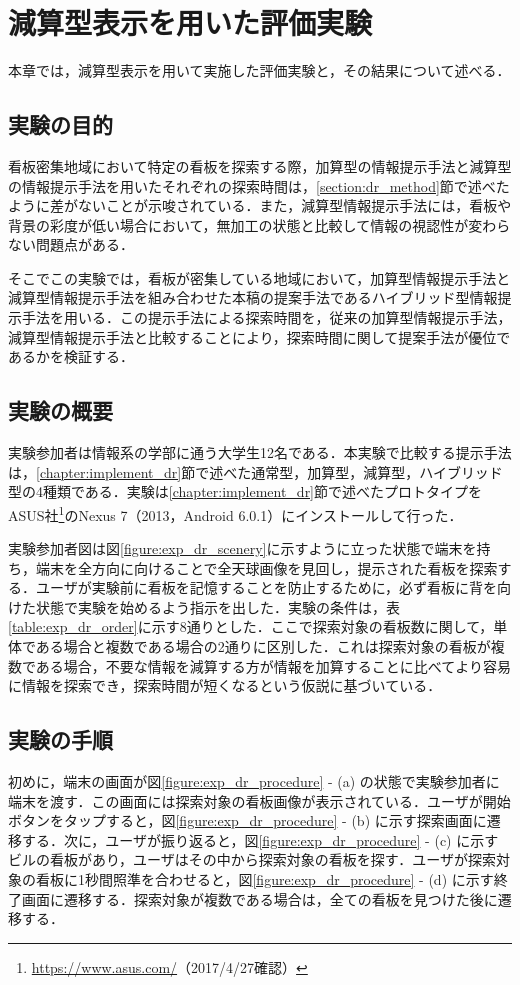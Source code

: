\chapter{減算型表示を用いた評価実験}
\label{chapter:experiment_dr}
本章では，減算型表示を用いて実施した評価実験と，その結果について述べる．
\section{実験の目的}
  看板密集地域において特定の看板を探索する際，加算型の情報提示手法と減算型の情報提示手法を用いたそれぞれの探索時間は，\ref{section:dr_method}節で述べたように差がないことが示唆されている．また，減算型情報提示手法には，看板や背景の彩度が低い場合において，無加工の状態と比較して情報の視認性が変わらない問題点がある．

  そこでこの実験では，看板が密集している地域において，加算型情報提示手法と減算型情報提示手法を組み合わせた本稿の提案手法であるハイブリッド型情報提示手法を用いる．この提示手法による探索時間を，従来の加算型情報提示手法，減算型情報提示手法と比較することにより，探索時間に関して提案手法が優位であるかを検証する．

\section{実験の概要}
  実験参加者は情報系の学部に通う大学生12名である．本実験で比較する提示手法は，\ref{chapter:implement_dr}節で述べた通常型，加算型，減算型，ハイブリッド型の4種類である．実験は\ref{chapter:implement_dr}節で述べたプロトタイプをASUS社\footnote{\url{https://www.asus.com/}（2017/4/27確認）}のNexus 7（2013，Android 6.0.1）にインストールして行った．

  実験参加者図は図\ref{figure:exp_dr_scenery}に示すように立った状態で端末を持ち，端末を全方向に向けることで全天球画像を見回し，提示された看板を探索する．ユーザが実験前に看板を記憶することを防止するために，必ず看板に背を向けた状態で実験を始めるよう指示を出した．実験の条件は，表\ref{table:exp_dr_order}に示す8通りとした．ここで探索対象の看板数に関して，単体である場合と複数である場合の2通りに区別した．これは探索対象の看板が複数である場合，不要な情報を減算する方が情報を加算することに比べてより容易に情報を探索でき，探索時間が短くなるという仮説に基づいている．

\section{実験の手順}
  初めに，端末の画面が図\ref{figure:exp_dr_procedure} - (a) の状態で実験参加者に端末を渡す．この画面には探索対象の看板画像が表示されている．ユーザが開始ボタンをタップすると，図\ref{figure:exp_dr_procedure} - (b) に示す探索画面に遷移する．次に，ユーザが振り返ると，図\ref{figure:exp_dr_procedure} - (c) に示すビルの看板があり，ユーザはその中から探索対象の看板を探す．ユーザが探索対象の看板に1秒間照準を合わせると，図\ref{figure:exp_dr_procedure} - (d) に示す終了画面に遷移する．探索対象が複数である場合は，全ての看板を見つけた後に遷移する．

